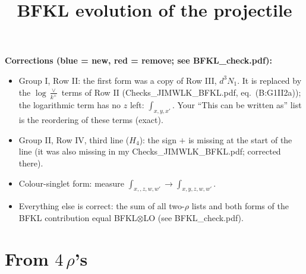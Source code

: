 \documentclass[9pt]{article}
\title{BFKL evolution of the projectile}
\author{}
\date{}
\numberwithin{equation}{section}
\begin{document}
\maketitle
{\color{blue}\noindent\textbf{Corrections (blue = new, red = remove; see BFKL\_check.pdf):}
\begin{itemize}
\item Group I, Row II: the first form was a copy of Row III, $d^3N_1$. It is replaced by the $\log\frac{\vee}{k^+}$ terms of Row II (Checks\_JIMWLK\_BFKL.pdf, eq.\ (B:G1II2a)); the logarithmic term has no $z$ left: $\int_{x,y,x'}$. Your ``This can be written as'' list is the reordering of these terms (exact).
\item Group II, Row IV, third line ($H_4$): the sign $+$ is missing at the start of the line (it was also missing in my Checks\_JIMWLK\_BFKL.pdf; corrected there).
\item Colour-singlet form: measure $\int_{x,,z,w,w'}\to\int_{x,y,z,w,w'}$.
\item Everything else is correct: the sum of all two-$\rho$ lists and both forms of the BFKL contribution equal BFKL$\otimes$LO (see BFKL\_check.pdf).
\end{itemize}}

\section{From $4$\,$\rho$'s}
\end{document}
